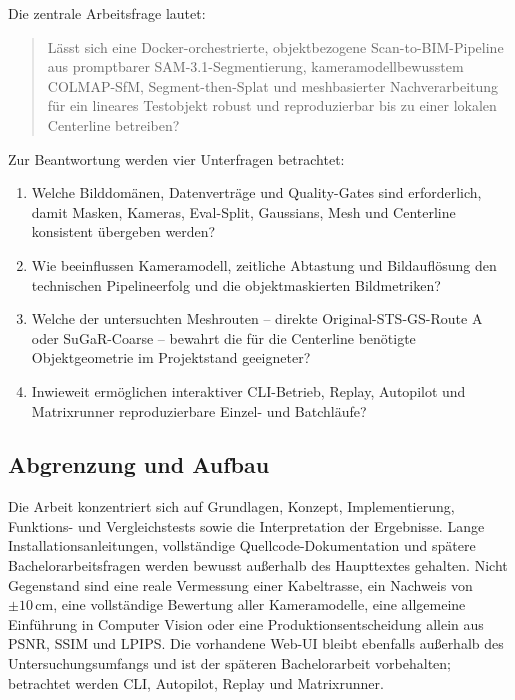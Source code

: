 Die zentrale Arbeitsfrage lautet:
\begin{quote}
Lässt sich eine Docker-orchestrierte, objektbezogene Scan-to-BIM-Pipeline aus
promptbarer SAM-3.1-Segmentierung, kameramodellbewusstem COLMAP-SfM,
Segment-then-Splat und meshbasierter Nachverarbeitung für ein lineares
Testobjekt robust und reproduzierbar bis zu einer lokalen Centerline betreiben?
\end{quote}

Zur Beantwortung werden vier Unterfragen betrachtet:

\begin{enumerate}
  \item Welche Bilddomänen, Datenverträge und Quality-Gates sind erforderlich,
	  damit Masken, Kameras, Eval-Split, Gaussians, Mesh und Centerline
	  konsistent übergeben werden?
  \item Wie beeinflussen Kameramodell, zeitliche Abtastung und Bildauflösung
	  den technischen Pipelineerfolg und die objektmaskierten Bildmetriken?
  \item Welche der untersuchten Meshrouten -- direkte Original-STS-GS-Route A
	  oder SuGaR-Coarse -- bewahrt die für die Centerline benötigte
	  Objektgeometrie im Projektstand geeigneter?
  \item Inwieweit ermöglichen interaktiver CLI-Betrieb, Replay, Autopilot und
	  Matrixrunner reproduzierbare Einzel- und Batchläufe?
\end{enumerate}

\subsection{Abgrenzung und Aufbau}

Die Arbeit konzentriert sich auf Grundlagen, Konzept, Implementierung,
Funktions- und Vergleichstests sowie die Interpretation der Ergebnisse. Lange
Installationsanleitungen, vollständige Quellcode-Dokumentation und spätere
Bachelorarbeitsfragen werden bewusst außerhalb des Haupttextes gehalten. Nicht
Gegenstand sind eine reale Vermessung einer Kabeltrasse, ein Nachweis von
$\pm10\,\mathrm{cm}$, eine vollständige Bewertung aller Kameramodelle, eine
allgemeine Einführung in Computer Vision oder eine Produktionsentscheidung
allein aus PSNR, SSIM und LPIPS. Die vorhandene Web-UI bleibt ebenfalls
außerhalb des Untersuchungsumfangs und ist der späteren Bachelorarbeit
vorbehalten; betrachtet werden CLI, Autopilot, Replay
und Matrixrunner.
